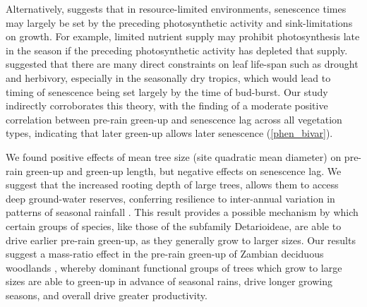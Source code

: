 \documentclass[11pt,a4paper]{article}
\begin{document}
Alternatively, \citet{Zani2020} suggests that in resource-limited environments,
senescence times may largely be set by the preceding photosynthetic activity
and sink-limitations on growth. For example, limited nutrient supply may
prohibit photosynthesis late in the season if the preceding photosynthetic
activity has depleted that supply. \citet{Reich1992} suggested that there are
many direct constraints on leaf life-span such as drought and herbivory,
especially in the seasonally dry tropics, which would lead to timing of
senescence being set largely by the time of bud-burst. Our study indirectly
corroborates this theory, with the finding of a moderate positive correlation
between pre-rain green-up and senescence lag across all vegetation types,
indicating that later green-up allows later senescence (\autoref{phen_bivar}).

We found positive effects of mean tree size (site quadratic mean diameter) on
pre-rain green-up and green-up length, but negative effects on senescence lag.
We suggest that the increased rooting depth of large trees, allows them to
access deep ground-water reserves, conferring resilience to inter-annual
variation in patterns of seasonal rainfall \citep{Holdo2017}. This result
provides a possible mechanism by which certain groups of species, like those of
the subfamily Detarioideae, are able to drive earlier pre-rain green-up, as
they generally grow to larger sizes. Our results suggest a mass-ratio effect in
the pre-rain green-up of Zambian deciduous woodlands \citep{Grime1998}, whereby
dominant functional groups of trees which grow to large sizes are able to
green-up in advance of seasonal rains, drive longer growing seasons, and
overall drive greater productivity.
\end{document}
